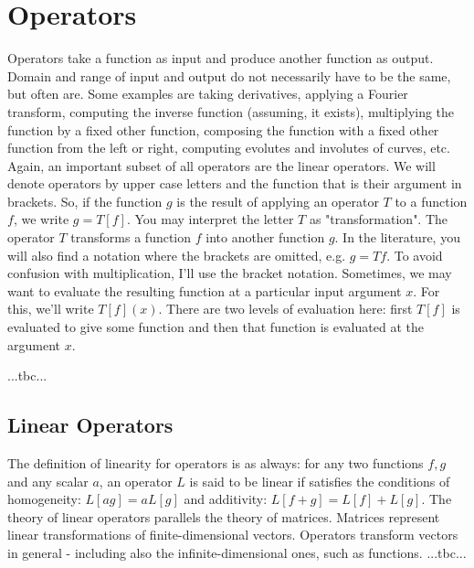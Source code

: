 \section{Operators}
Operators take a function as input and produce another function as output. Domain and range of input and output do not necessarily have to be the same, but often are. Some examples are taking derivatives, applying a Fourier transform, computing the inverse function (assuming, it exists), multiplying the function by a fixed other function, composing the function with a fixed other function from the left or right, computing evolutes and involutes of curves, etc. Again, an important subset of all operators are the linear operators. We will denote operators by upper case letters and the function that is their argument in brackets. So, if the function $g$ is the result of applying an operator $T$ to a function $f$, we write $g = T[f]$. You may interpret the letter $T$ as "transformation". The operator $T$ transforms a function $f$ into another function $g$. In the literature, you will also find a notation where the brackets are omitted, e.g. $g = T f$. To avoid confusion with multiplication, I'll use the bracket notation. Sometimes, we may want to evaluate the resulting function at a particular input argument $x$. For this, we'll write $T[f](x)$. There are two levels of evaluation here: first $T[f]$ is evaluated to give some function and then that function is evaluated at the argument $x$.

...tbc...




\subsection{Linear Operators}
The definition of linearity for operators is as always: for any two functions $f,g$ and any scalar $a$, an operator $L$ is said to be linear if satisfies the conditions of homogeneity: $L[a g] = a L[g]$ and additivity: $L[f+g] = L[f] + L[g]$. The theory of linear operators parallels the theory of matrices. Matrices represent linear transformations of finite-dimensional vectors. Operators transform vectors in general - including also the infinite-dimensional ones, such as functions. ...tbc...


% 


